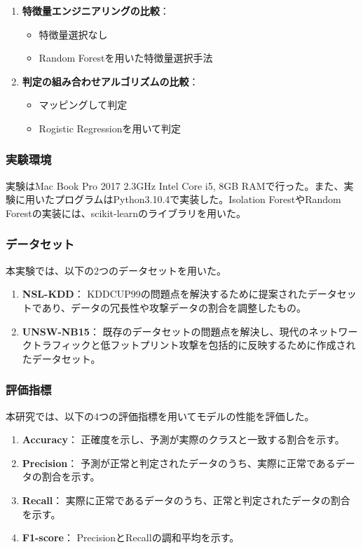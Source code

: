 \documentclass{css}
\begin{document}
\begin{enumerate}
    \item \textbf{特徴量エンジニアリングの比較}：
        \begin{itemize}
            \item 特徴量選択なし
            \item Random Forestを用いた特徴量選択手法
        \end{itemize}
    \item \textbf{判定の組み合わせアルゴリズムの比較}：
        \begin{itemize}
            \item マッピングして判定
            \item Rogistic Regressionを用いて判定
        \end{itemize}
\end{enumerate}

\subsubsection{実験環境}

実験はMac Book Pro 2017 2.3GHz Intel Core i5, 8GB RAMで行った。また、実験に用いたプログラムはPython3.10.4で実装した。Isolation ForestやRandom Forestの実装には、scikit-learnのライブラリを用いた。

\subsubsection{データセット}
本実験では、以下の2つのデータセットを用いた。

\begin{enumerate}
    \item \textbf{NSL-KDD}：
        KDDCUP99の問題点を解決するために提案されたデータセットであり、データの冗長性や攻撃データの割合を調整したもの。
    \item \textbf{UNSW-NB15}：
        既存のデータセットの問題点を解決し、現代のネットワークトラフィックと低フットプリント攻撃を包括的に反映するために作成されたデータセット。
\end{enumerate}

\subsubsection{評価指標}
本研究では、以下の4つの評価指標を用いてモデルの性能を評価した。

\begin{enumerate}
    \item \textbf{Accuracy}：
        正確度を示し、予測が実際のクラスと一致する割合を示す。
    \item \textbf{Precision}：
        予測が正常と判定されたデータのうち、実際に正常であるデータの割合を示す。
    \item \textbf{Recall}：
        実際に正常であるデータのうち、正常と判定されたデータの割合を示す。
    \item \textbf{F1-score}：
        PrecisionとRecallの調和平均を示す。
\end{enumerate}
\end{document}
